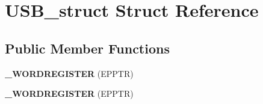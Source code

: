 \hypertarget{struct_u_s_b__struct}{}\section{U\+S\+B\+\_\+struct Struct Reference}
\label{struct_u_s_b__struct}
\subsection*{Public Member Functions}
\begin{DoxyCompactItemize}
\item 
{\bfseries \+\_\+\+W\+O\+R\+D\+R\+E\+G\+I\+S\+T\+ER} (E\+P\+P\+TR)\hypertarget{struct_u_s_b__struct_a17ec7d7bda2f24bdba324bd14edfe208}{}\label{struct_u_s_b__struct_a17ec7d7bda2f24bdba324bd14edfe208}

\item 
{\bfseries \+\_\+\+W\+O\+R\+D\+R\+E\+G\+I\+S\+T\+ER} (E\+P\+P\+TR)\hypertarget{struct_u_s_b__struct_a17ec7d7bda2f24bdba324bd14edfe208}{}\label{struct_u_s_b__struct_a17ec7d7bda2f24bdba324bd14edfe208}

\end{DoxyCompactItemize}
